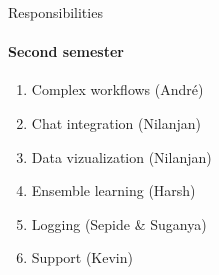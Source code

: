 \begin{frame}{Responsibilities}
\framesubtitle{Second semester}
	\begin{enumerate}
		\item Complex workflows (André)
		\item Chat integration (Nilanjan)
		\item Data vizualization (Nilanjan)
		\item Ensemble learning  (Harsh)
		\item Logging (Sepide \& Suganya)
		\item Support (Kevin)
	\end{enumerate}
\end{frame}